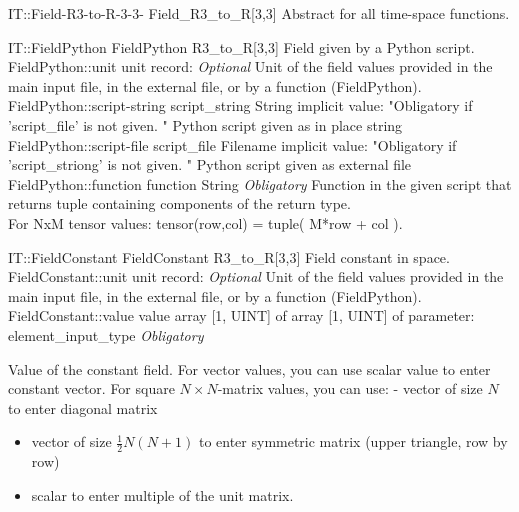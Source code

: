 \begin{AbstractType}
	{IT::Field-R3-to-R-3-3-}
	{Field{\_}R3{\_}to{\_}R[3,3]}
	{}
	{{{Abstract for all time-space functions.}%
}}
\end{AbstractType}
\begin{RecordType}
	{IT::FieldPython}
	{FieldPython}
	{}%
	{}%
	{{{R3{\_}to{\_}R[3,3] Field given by a Python script.}%
}}
		\RecKey
			{FieldPython::unit}
			{unit}
			{{record: }}{}
			{ \it{Optional}}
			{{{Unit of the field values provided in the main input file, in the external file, or by a function (FieldPython).}%
}}
		\RecKey
			{FieldPython::script-string}
			{script{\_}string}
			{{String}}{}
			{implicit value: "{Obligatory if 'script{\_}file' is not given. }"}
			{{{Python script given as in place string}%
}}
		\RecKey
			{FieldPython::script-file}
			{script{\_}file}
			{{Filename}}{}
			{implicit value: "{Obligatory if 'script{\_}striong' is not given. }"}
			{{{Python script given as external file}%
}}
		\RecKey
			{FieldPython::function}
			{function}
			{{String}}{}
			{ \it{Obligatory}}
			{{{Function in the given script that returns tuple containing components of the return type.}\\{
For NxM tensor values: tensor(row,col) = tuple( M*row + col ).}%
}}
\end{RecordType}
\begin{RecordType}
	{IT::FieldConstant}
	{FieldConstant}
	{}%
	{}%
	{{{R3{\_}to{\_}R[3,3] Field constant in space.}%
}}
		\RecKey
			{FieldConstant::unit}
			{unit}
			{{record: }}{}
			{ \it{Optional}}
			{{{Unit of the field values provided in the main input file, in the external file, or by a function (FieldPython).}%
}}
		\RecKey
			{FieldConstant::value}
			{value}
			{{array [1, UINT] of }{array [1, UINT] of }{parameter: element{\_}input{\_}type}}{}
			{ \it{Obligatory}}
			{{{{Value of the constant field.
For vector values, you can use scalar value to enter constant vector.
For square }{$N\times N$}{-matrix values, you can use:  - vector of size }{$N$}{ to enter diagonal matrix}
% 
}
\begin{itemize}
\item {vector of size }{$\frac12N(N+1)$}{ to enter symmetric matrix (upper triangle, row by row)}
\item {scalar to enter multiple of the unit matrix.}
\end{itemize}
}}
\end{RecordType}
